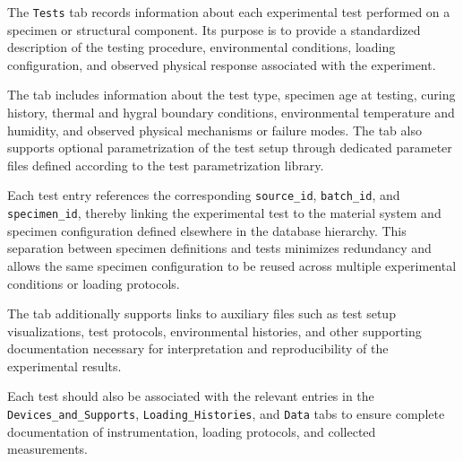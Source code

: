 \documentclass[11pt]{book}
\begin{document}
The \texttt{Tests} tab records information about each experimental test performed on a specimen or structural component. Its purpose is to provide a standardized description of the testing procedure, environmental conditions, loading configuration, and observed physical response associated with the experiment.

The tab includes information about the test type, specimen age at testing, curing history, thermal and hygral boundary conditions, environmental temperature and humidity, and observed physical mechanisms or failure modes. The tab also supports optional parametrization of the test setup through dedicated parameter files defined according to the test parametrization library.

Each test entry references the corresponding \texttt{source\_id}, \texttt{batch\_id}, and \texttt{specimen\_id}, thereby linking the experimental test to the material system and specimen configuration defined elsewhere in the database hierarchy. This separation between specimen definitions and tests minimizes redundancy and allows the same specimen configuration to be reused across multiple experimental conditions or loading protocols.

The tab additionally supports links to auxiliary files such as test setup visualizations, test protocols, environmental histories, and other supporting documentation necessary for interpretation and reproducibility of the experimental results.

Each test should also be associated with the relevant entries in the \texttt{Devices\_and\_Supports}, \texttt{Loading\_Histories}, and \texttt{Data} tabs to ensure complete documentation of instrumentation, loading protocols, and collected measurements.
\end{document}
